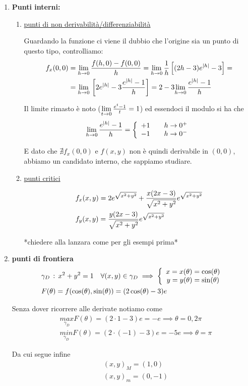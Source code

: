 \begin{enumerate}
	\item \textbf{Punti interni:}
	\begin{enumerate}
		\item \underline{punti di non derivabilità/differenziabilità}
		
		\smallskip
		
		Guardando la funzione ci viene il dubbio che l'origine sia un punto di questo tipo, controlliamo:
		\begin{align}
			f_x(0,0) {}&= \underset{h \rightarrow 0}{\lim} \, \frac{f(h,0) - f(0,0)}{h} = \underset{h \rightarrow 0}{\lim} \, \frac{1}{h} \left[ (2h-3)e^{|h|} -3 \right] = \nonumber \\
			&= \underset{h \rightarrow 0}{\lim} \, \left[ 2e^{|h|} -3\frac{e^{|h|} - 1}{h} \right] = 2 - 3 \underset{h \rightarrow 0}{\lim} \,\frac{e^{|h|} - 1}{h} 
		\end{align}
		
		Il limite rimasto è noto ($\underset{t \rightarrow 0}{\lim} \, \frac{e^{t} - 1}{t}=1$) ed essendoci il modulo si ha che
		\begin{align}
			\underset{h \rightarrow 0}{\lim} \,\frac{e^{|h|} - 1}{h} =\left\{\begin{array}{cc} +1 \quad {}&h\rightarrow 0^+  \\ -1 \quad &h\rightarrow 0^- \end{array}\right.
		\end{align}
		
		E dato che $\nexists f_x(0,0)$ e $f(x,y)$ non è quindi derivabile in $(0,0)$, abbiamo un candidato interno, che sappiamo studiare.
		
		\bigskip
		
		\item \underline{punti critici}
		
		\begin{align}
			{}&f_x(x,y)= 2e^{\sqrt{x^2 + y^2}} + \frac{x(2x-3)}{\sqrt{x^2 + y^2}}e^{\sqrt{x^2 + y^2}}\\
			& f_y(x,y)= \frac{y(2x-3)}{\sqrt{x^2 + y^2}}e^{\sqrt{x^2 + y^2}}
		\end{align}
		
		*chiedere alla lanzara come per gli esempi prima*
		
	\end{enumerate}
	\item \textbf{punti di frontiera}
	\begin{align}
		{}&\gamma_D \, : \, x^2 + y^2 =1 \quad \forall (x,y)\in \gamma_D \implies \left\{\begin{array}{cc} x= x(\theta) = \cos (\theta) \\ y = y(\theta)= \sin(\theta) \end{array}\right.\\
		&F(\theta)= f(\cos (\theta),\sin (\theta)) = (2\cos (\theta) - 3)e
	\end{align}
	
	Senza dover ricorrere alle derivate notiamo come
	\begin{align}
		{}&\underset{\gamma_D}{max} F(\theta)= (2 \cdot 1 - 3)e=-e \implies \theta=0,2\pi \\
		&\underset{\gamma_D}{min} F(\theta)= (2 \cdot (-1) - 3)e=-5e \implies \theta=\pi 
	\end{align}
	
	Da cui segue infine
	\begin{align}
		{}&(x,y)_M=(1,0)\\
		&(x,y)_m=(0,-1)
	\end{align}
\end{enumerate}

